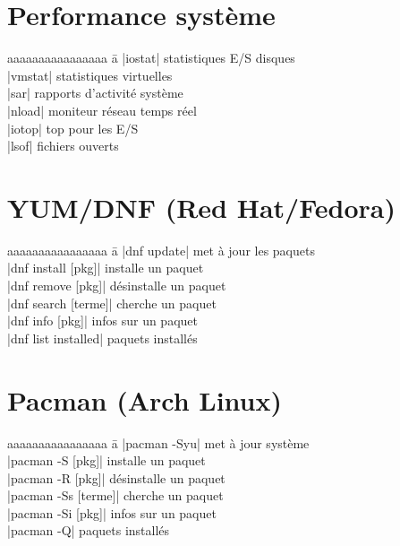 \documentclass{article}
\begin{document}
\begin{multicols}{4}
    \section*{Performance système}
    \begin{tabbing}
        aaaaaaaaaaaaaaaa \= a \kill
        \code|iostat| \> statistiques E/S disques \\
        \code|vmstat| \> statistiques virtuelles \\
        \code|sar| \> rapports d'activité système \\
        \code|nload| \> moniteur réseau temps réel \\
        \code|iotop| \> top pour les E/S \\
        \code|lsof| \> fichiers ouverts \\
    \end{tabbing}

    \section*{YUM/DNF (Red Hat/Fedora)}
    \begin{tabbing}
        aaaaaaaaaaaaaaaa \= a \kill
        \code|dnf update| \> met à jour les paquets \\
        \code|dnf install [pkg]| \> installe un paquet \\
        \code|dnf remove [pkg]| \> désinstalle un paquet \\
        \code|dnf search [terme]| \> cherche un paquet \\
        \code|dnf info [pkg]| \> infos sur un paquet \\
        \code|dnf list installed| \> paquets installés \\
    \end{tabbing}

    \section*{Pacman (Arch Linux)}
    \begin{tabbing}
        aaaaaaaaaaaaaaaa \= a \kill
        \code|pacman -Syu| \> met à jour système \\
        \code|pacman -S [pkg]| \> installe un paquet \\
        \code|pacman -R [pkg]| \> désinstalle un paquet \\
        \code|pacman -Ss [terme]| \> cherche un paquet \\
        \code|pacman -Si [pkg]| \> infos sur un paquet \\
        \code|pacman -Q| \> paquets installés \\
    \end{tabbing}




\end{multicols}
\end{document}
